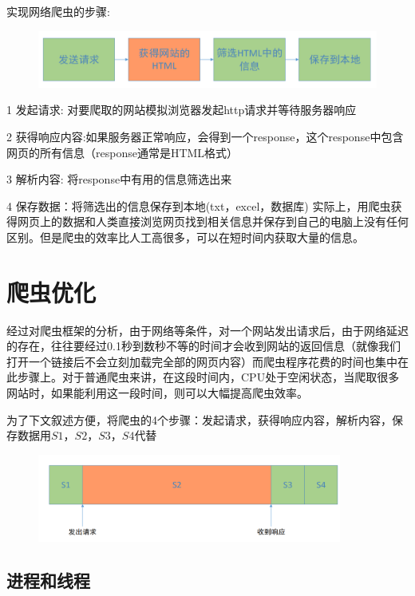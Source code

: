 \documentclass[UTF-8]{ctexart}
\begin{document}
实现网络爬虫的步骤:

\begin{figure}[h]
  \centering
  \includegraphics[width=12cm]{1.png}
\end{figure}

1   发起请求: 对要爬取的网站模拟浏览器发起http请求并等待服务器响应

2   获得响应内容:如果服务器正常响应，会得到一个response，这个response中包含网页的所有信息（response通常是HTML格式）

3   解析内容: 将response中有用的信息筛选出来

4   保存数据：将筛选出的信息保存到本地(txt，excel，数据库)
\newline
\newline
实际上，用爬虫获得网页上的数据和人类直接浏览网页找到相关信息并保存到自己的电脑上没有任何区别。但是爬虫的效率比人工高很多，可以在短时间内获取大量的信息。

\section{爬虫优化}

经过对爬虫框架的分析，由于网络等条件，对一个网站发出请求后，由于网络延迟的存在，往往要经过0.1秒到数秒不等的时间才会收到网站的返回信息（就像我们打开一个链接后不会立刻加载完全部的网页内容）而爬虫程序花费的时间也集中在此步骤上。对于普通爬虫来讲，在这段时间内，CPU处于空闲状态，当爬取很多网站时，如果能利用这一段时间，则可以大幅提高爬虫效率。

为了下文叙述方便，将爬虫的4个步骤：发起请求，获得响应内容，解析内容，保存数据用$S1$，$S2$，$S3$，$S4$代替

\begin{figure}[h]
  \centering
  \includegraphics[width=10cm]{2.png}
\end{figure}

\subsection{进程和线程}
\end{document}
